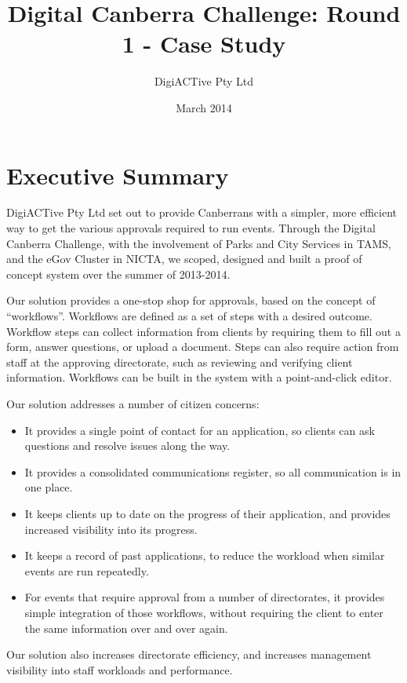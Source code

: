 \documentclass[12pt,a4paper,twosided]{article}
\title{Digital Canberra Challenge: Round 1 - Case Study}
\author{DigiACTive Pty Ltd}
\date{March 2014}
\begin{document}
\maketitle
\newpage
\section{Executive Summary}

DigiACTive Pty Ltd set out to provide Canberrans with a simpler, more
efficient way to get the various approvals required to run events.
Through the Digital Canberra Challenge, with the involvement of Parks and
City Services in TAMS, and the eGov Cluster in NICTA, we scoped,
designed and built a proof of concept system over the summer of
2013-2014.

Our solution provides a one-stop shop for approvals, based on the
concept of ``workflows''. Workflows are defined as a set of steps with a
desired outcome. Workflow steps can collect information from clients by
requiring them to fill out a form, answer questions, or upload a
document. Steps can also require action from staff at the approving
directorate, such as reviewing and verifying client information.
Workflows can be built in the system with a point-and-click editor.

Our solution addresses a number of citizen concerns:

\begin{itemize}

\item
  It provides a single point of contact for an application, so clients
  can ask questions and resolve issues along the way.
\item
  It provides a consolidated communications register, so all
  communication is in one place.
\item
  It keeps clients up to date on the progress of their application, and
  provides increased visibility into its progress.
\item
  It keeps a record of past applications, to reduce the workload when
  similar events are run repeatedly.
\item
  For events that require approval from a number of directorates, it
  provides simple integration of those workflows, without requiring the
  client to enter the same information over and over again.
\end{itemize}

Our solution also increases directorate efficiency, and increases
management visibility into staff workloads and performance.
\end{document}
